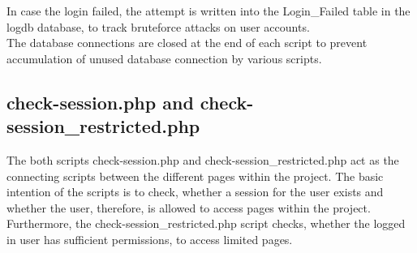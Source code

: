 In case the login failed, the attempt is written into the Login\_Failed table in the logdb database, to track bruteforce attacks on user accounts.\\
The database connections are closed at the end of each script to prevent accumulation of unused database connection by various scripts.

\subsection{check-session.php and check-session\_restricted.php}
The both scripts check-session.php and check-session\_restricted.php act as the connecting scripts between the different pages within the project. The basic intention of the scripts is to check, whether a session for the user exists and whether the user, therefore, is allowed to access pages within the project. Furthermore, the check-session\_restricted.php script checks, whether the logged in user has sufficient 
permissions, to access limited pages. 
